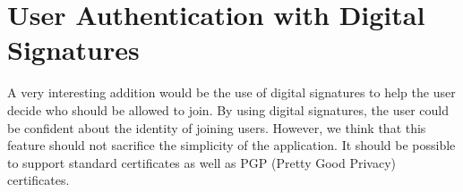 \section{User Authentication with Digital Signatures}
A very interesting addition would be the use of digital signatures to help
the user decide who should be allowed to join. By using digital
signatures, the user could be confident about the identity of joining users.
However, we think that this feature should not sacrifice the simplicity
of the application. It should be possible to support standard certificates
as well as PGP (Pretty Good Privacy) certificates.



